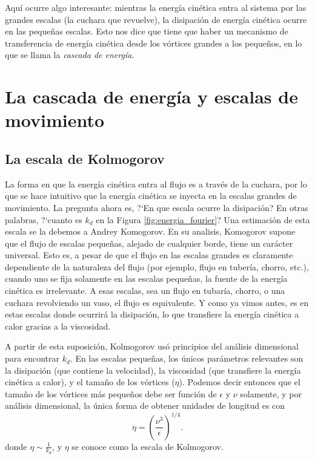 Aquí ocurre algo interesante: mientras la energía cinética entra al sistema por las grandes escalas (la cuchara que revuelve), la disipación de energía cinética ocurre en las pequeñas escalas.
Esto nos dice que tiene que haber un mecanismo de transferencia de energía cinética desde los vórtices grandes a los pequeños, en lo que se llama la \emph{cascada de energía}.

\section*{La cascada de energía y escalas de movimiento}

\subsection*{La escala de Kolmogorov}
La forma en que la energía cinética entra al flujo es a través de la cuchara, por lo que se hace intuitivo que la energía cinética se inyecta en la escalas grandes de movimiento.
La pregunta ahora es, \mbox{?`}En que escala ocurre la disipación? En otras palabras, \mbox{?`}cuanto es $k_d$ en la Figura \ref{fig:energia_fourier}?
Una estimación de esta escala se la debemos a Andrey Komogorov.
En su analisis, Komogorov supone que el flujo de escalas pequeñas, alejado de cualquier borde, tiene un carácter universal.
Esto es, a pesar de que el flujo en las escalas grandes es claramente dependiente de la naturaleza del flujo (por ejemplo, flujo en tubería, chorro, etc.), cuando uno se fija solamente en las escalas pequeñas, la fuente de la energía cinética es irrelevante.
A esas escalas, sea un flujo en tubaría, chorro, o una cuchara revolviendo un vaso, el flujo es equivalente.
Y como ya vimos antes, es en estas escalas donde ocurrirá la disipación, lo que transfiere la energía cinética a calor gracias a la viscosidad.

A partir de esta suposición, Kolmogorov usó principios del análisis dimensional para encontrar $k_d$.
En las escalas pequeñas, los únicos parámetros relevantes son la disipación (que contiene la velocidad), la viscosidad (que transfiere la energía cinética a calor), y el tamaño de los vórtices ($\eta$).
Podemos decir entonces que el tamaño de los vórtices más pequeños debe ser función de $\epsilon$ y  $\nu$ solamente, y por análisis dimensional, la única forma de obtener unidades de longitud es con
%
\begin{equation}\label{eq:l_kol}
\eta = \left(\frac{\nu^3}{\epsilon}\right)^{1/4}.
\end{equation}
%
donde $\eta\sim\frac{1}{k_d}$, y $\eta$ se conoce como la escala de Kolmogorov.

